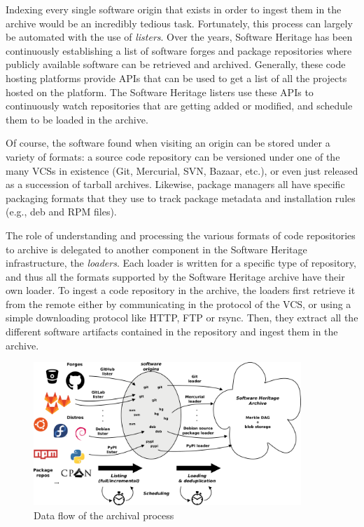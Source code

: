 Indexing every single software origin that exists in order to ingest them in
the archive would be an incredibly tedious task. Fortunately, this process can
largely be automated with the use of \emph{listers}. Over the years, Software
Heritage has been continuously establishing a list of software forges and
package repositories where publicly available software can be retrieved and
archived. Generally, these code hosting platforms provide APIs that can be used
to get a list of all the projects hosted on the platform. The Software Heritage
listers use these APIs to continuously watch repositories that are getting
added or modified, and schedule them to be loaded in the archive.

Of course, the software found when visiting an origin can be stored under a
variety of formats: a source code repository can be versioned under one of the
many \glspl{VCS} in existence (Git, Mercurial, SVN, Bazaar, etc.), or even just
released as a succession of tarball archives. Likewise, package managers all
have specific packaging formats that they use to track package metadata and
installation rules (e.g., deb and RPM files).

The role of understanding and processing the various formats of code
repositories to archive is delegated to another component in the Software
Heritage infrastructure, the \emph{loaders}. Each loader is written for a
specific type of repository, and thus all the formats supported by the Software
Heritage archive have their own loader. To ingest a code repository in the
archive, the loaders first retrieve it from the remote either by communicating
in the protocol of the VCS, or using a simple downloading protocol like HTTP,
FTP or rsync. Then, they extract all the different software artifacts contained
in the repository and ingest them in the archive.

\begin{figure}
\begin{center}
    \includegraphics[width=0.9\textwidth]{../img/swh-dataflow}
\end{center}
\caption{Data flow of the archival process}%
\label{fig:archival-data-flow}
\end{figure}

